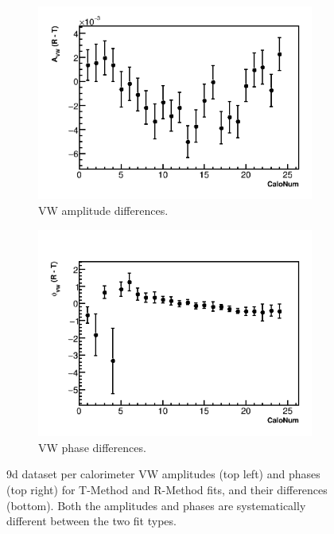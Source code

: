 \documentclass[12pt,letterpaper]{article}
\begin{document}
\begin{figure}[]
    \begin{subfigure}[t]{0.45\textwidth}
        \centering
        \includegraphics[width=\textwidth]{9d_noTimeRand_Avw_Diff}
        \caption{VW amplitude differences.}
    \end{subfigure}%
    \hspace{5mm}
    \begin{subfigure}[t]{0.45\textwidth}
        \centering
        \includegraphics[width=\textwidth]{9d_noTimeRand_Phivw_Diff}
        \caption{VW phase differences.}
    \end{subfigure}
\caption[]{9d dataset per calorimeter VW amplitudes (top left) and phases (top right) for T-Method and R-Method fits, and their differences (bottom). Both the amplitudes and phases are systematically different between the two fit types.}
\label{fig:9d_VW_calo_noRand}
\end{figure}
\end{document}
